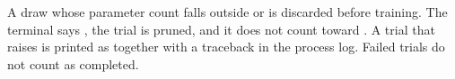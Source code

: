 A draw whose parameter count falls outside  or  is discarded before training.
The terminal says , the trial is pruned, and it does not count toward .
A trial that raises is printed as  together with a traceback in the process log.
Failed trials do not count as completed.
